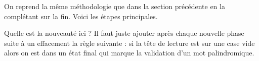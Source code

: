 On reprend la même méthodologie que dans la section précédente en la complétant sur la fin. Voici les étapes principales.



\vspace{-1em}


Quelle est la nouveauté ici ? Il faut juste ajouter après chaque nouvelle phase suite à un effacement la règle suivante : si la tête de lecture est sur une case vide alors on est dans un état final qui marque la validation d'un mot palindromique.